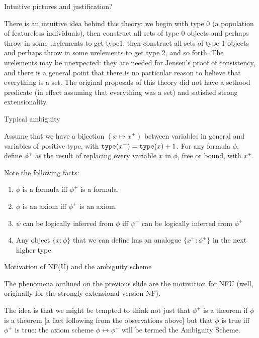 \documentclass{slides}
\begin{document}
\begin{slide}

{\Large Intuitive pictures and justification?}

There is an intuitive idea behind this theory:  we begin with type 0 (a population of featureless individuals), then construct all sets of type 0 objects and perhaps throw in some urelements to get type1,  then construct all sets of type 1 objects and perhaps throw in some urelements to get type 2, and so forth.  The urelements may be unexpected:  they are needed for Jensen's proof of consistency, and there is a general point that there is no particular reason to believe that everything is a set.  The original proposals of this theory did not have a sethood predicate (in effect assuming that everything was a set) and satisfied strong extensionality.


\end{slide}

\begin{slide}

{\Large Typical ambiguity}

Assume that we have a bijection $(x \mapsto x^+)$ between variables in general and variables of positive type, with ${\tt type}(x^+) = {\tt type}(x)+1$.  For any formula $\phi$,
define $\phi^+$ as the result of replacing every variable $x$ in $\phi$, free or bound, with $x^+$.  

Note the following facts:

\begin{enumerate}

\item  $\phi$ is a formula iff $\phi^+$ is a formula.

\item  $\phi$ is an axiom iff $\phi^+$ is an axiom.

\item  $\psi$ can be logically inferred from $\phi$ iff  $\psi^+$ can be logically inferred from $\phi^+$

\item  Any object $\{x:\phi\}$ that we can define has an analogue $\{x^+:\phi^+\}$ in the next higher type.

\end{enumerate}

\end{slide}

\begin{slide}

{\Large Motivation of NF(U) and the ambiguity scheme}

The phenomena outlined on the previous slide are the motivation for NFU (well, originally for the strongly extensional version NF).

The idea is that we might be tempted to think not just that $\phi^+$ is a theorem if $\phi$ is a theorem [a fact following from the observations above] but that $\phi$ is true iff $\phi^+$ is true:  the axiom scheme
$\phi \leftrightarrow \phi^+$ will be termed the Ambiguity Scheme.

\end{slide}
\end{document}
